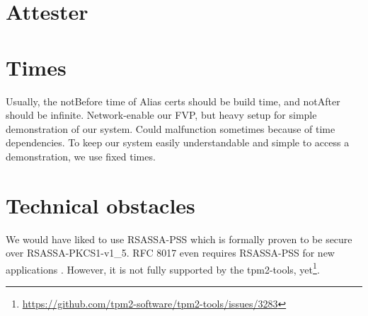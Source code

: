 \section{Attester}

\section{Times}

Usually, the notBefore time of Alias certs should be build time, and notAfter should be infinite.
Network-enable our FVP, but heavy setup for simple demonstration of our system.
Could malfunction sometimes because of time dependencies.
To keep our system easily understandable and simple to access a demonstration, we use fixed times.


\section{Technical obstacles}

We would have liked to use RSASSA-PSS which is formally proven to be secure over RSASSA-PKCS1-v1\_5.
RFC 8017 even requires RSASSA-PSS for new applications  \cite{Moriarty2016}.
However, it is not fully supported by the tpm2-tools, yet\footnote{\url{https://github.com/tpm2-software/tpm2-tools/issues/3283}}.
